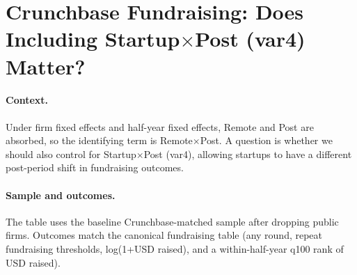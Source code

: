 \documentclass{article}
\newcommand{\cleanedresultsdir}{../results/cleaned/tex}
\begin{document}
\thispagestyle{empty}

\section*{Crunchbase Fundraising: Does Including Startup$\times$Post (var4) Matter?}

\paragraph{Context.}
Under firm fixed effects and half-year fixed effects, Remote and Post are absorbed, so the identifying term
is Remote$\times$Post. A question is whether we should also control for Startup$\times$Post (var4), allowing
startups to have a different post-period shift in fundraising outcomes.

\paragraph{Sample and outcomes.}
The table uses the baseline Crunchbase-matched sample after dropping public firms.
Outcomes match the canonical fundraising table (any round, repeat fundraising thresholds, log(1+USD raised), and a within-half-year q100 rank of USD raised).

\begin{table}[h!]
\caption{\textbf{Remote$\times$Post Coefficients With vs Without Startup$\times$Post Control (Baseline Private Sample)}}

\end{table}
\end{document}
